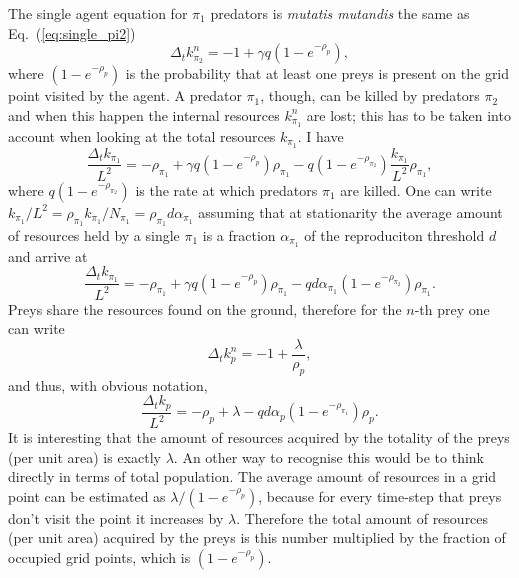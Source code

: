 \documentclass[10pt]{article}
\begin{document}
The single agent equation for $\pi_1$ predators is {\it mutatis mutandis} the same as
Eq.~(\ref{eq:single_pi2})
\begin{equation}
\label{eq:single_pi1}
\Delta_tk^n_{\pi_2} = -1 + \gamma q (1-e^{-\rho_p}),
\end{equation}
where $(1-e^{-\rho_p})$ is the probability that at least one preys is present on the grid point
visited by the agent. A predator $\pi_1$, though, can be killed by predators $\pi_2$ and when this happen
the internal resources $k^n_{\pi_1}$ are lost; this has to be taken into account when looking at the
total resources $k_{\pi_1}$. I have
\begin{equation}
\frac{\Delta_tk_{\pi_1}}{L^2} = -\rho_{\pi_1}+ \gamma q (1-e^{-\rho_p})\rho_{\pi_1}-q(1-e^{-\rho_{\pi_2}})\frac{k_{\pi_1}}{L^2}\rho_{\pi_1},
\end{equation}
where $q(1-e^{-\rho_{\pi_2}})$ is the rate at which predators $\pi_1$ are killed. One can write
$k_{\pi_1}/L^2=\rho_{\pi_1}k_{\pi_1}/N_{\pi_1}=\rho_{\pi_1}d\alpha_{\pi_1}$ assuming that at stationarity
the average amount of resources held by a single $\pi_1$ is a fraction $\alpha_{\pi_1}$ of the reproduciton
threshold $d$ and arrive at
\begin{equation}
\frac{\Delta_tk_{\pi_1}}{L^2} = -\rho_{\pi_1}+ \gamma q (1-e^{-\rho_p})\rho_{\pi_1}-qd\alpha_{\pi_1}(1-e^{-\rho_{\pi_2}})\rho_{\pi_1}.
\end{equation}
Preys share the resources found on the ground, therefore for the $n$-th prey one can write
\begin{equation}
\Delta_tk^n_p = -1 + \frac{\lambda}{\rho_p},
\end{equation}
and thus, with obvious notation,
\begin{equation}
\frac{\Delta_tk_p}{L^2} = -\rho_p +\lambda-qd\alpha_p(1-e^{-\rho_{\pi_1}})\rho_p.
\end{equation}
It is interesting that the amount of resources acquired by the totality of the preys (per unit area)
is exactly $\lambda$.
An other way to recognise this would be to think directly in terms of total population.
The average amount of resources in a grid point can be estimated as $\lambda/(1-e^{-\rho_p})$,
because for every time-step that preys don't visit the point it increases by $\lambda$.
Therefore the total amount of resources (per unit area) acquired by the preys is this number
multiplied by the fraction of occupied grid points, which is $(1-e^{-\rho_p})$.
\end{document}
